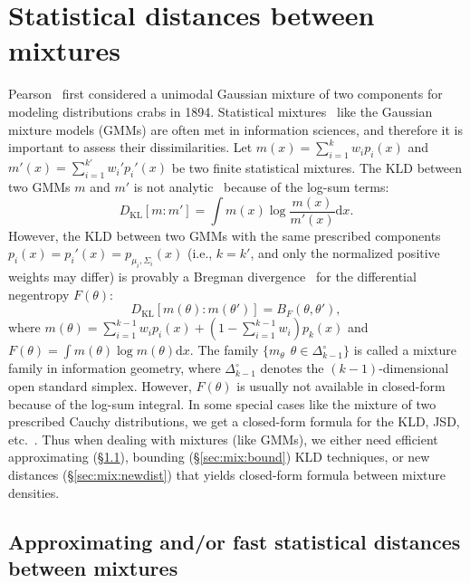 \documentclass[11pt]{article}
\def\KL{\mathrm{KL}}
\def\dx{\mathrm{d}x}
\def\KL{\mathrm{KL}}
\begin{document}
\section{Statistical distances between mixtures}

Pearson~\cite{pearson1894contributions} first considered a unimodal Gaussian mixture of two components for modeling distributions crabs in 1894.
Statistical mixtures~\cite{mclachlan1988mixture} like the Gaussian mixture models (GMMs) are often met in information sciences, and therefore it is important to assess their dissimilarities.
Let $m(x)=\sum_{i=1}^k w_i p_i(x)$ and  $m'(x)=\sum_{i=1}^{k'} w_i' p_i'(x)$ be two finite statistical mixtures.
The KLD between two GMMs $m$ and $m'$ is not analytic~\cite{KLnotanalytic-2004} because of the log-sum terms:
$$
D_\KL[m:m']=\int m(x)\log\frac{m(x)}{m'(x)} \dx.
$$
However, the KLD between two GMMs with the same prescribed components $p_i(x)=p_i'(x)=p_{\mu_i,\Sigma_i}(x)$ (i.e., $k=k'$, and only the normalized positive weights may differ) is provably a Bregman divergence~\cite{wmixtures-2018} for the differential negentropy $F(\theta)$: 
$$
D_\KL[m(\theta):m(\theta')]=B_F(\theta,\theta'),
$$
where $m(\theta)=\sum_{i=1}^{k-1} w_ip_i(x)+(1-\sum_{i=1}^{k-1} w_i)p_k(x)$ and
$F(\theta)=\int m(\theta)\log m(\theta)\dx$. The family $\{m_\theta\: \ \theta\in\Delta_{k-1}^\circ\}$ is called a mixture family in information geometry, where $\Delta_{k-1}^\circ$ denotes the $(k-1)$-dimensional open standard simplex.
However, $F(\theta)$ is usually not available in closed-form because of the log-sum integral.
In some special cases like the mixture of two prescribed Cauchy distributions, we get a closed-form formula for the KLD, JSD, etc.~\cite{CauchyJSD-2021,nielsen2021dually}.
Thus when dealing with mixtures (like GMMs), we either need efficient approximating  (\S\ref{sec:mix:approx}), bounding (\S\ref{sec:mix:bound}) KLD techniques, or new distances (\S\ref{sec:mix:newdist}) that yields closed-form formula between mixture densities.



\subsection{Approximating and/or fast statistical distances between mixtures}\label{sec:mix:approx}
\end{document}
